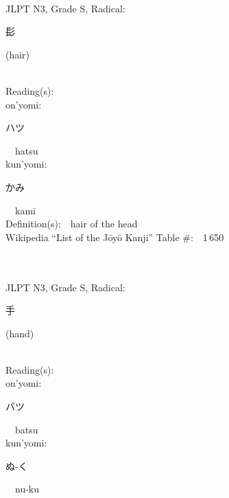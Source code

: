 \begin{multicols}{2}
{\fontsize{34pt}{40pt}  }\ \ \\  %
{JLPT N3, Grade S, Radical:\ \ {\begin{CJK}{UTF8}{min} 髟 \end{CJK}} (hair) } \\
Reading(s):\ \ \\
{\hspace*{1em}}on'yomi:\ \ \\
{\hspace*{2em}}{\begin{CJK}{UTF8}{min} ハツ \end{CJK}}\ \ hatsu\ \ \\
{\hspace*{1em}}kun'yomi:\ \ \\
{\hspace*{2em}}{\begin{CJK}{UTF8}{min} かみ \end{CJK}}\ \ kami\ \ \\
Definition(s):\ \ hair of the head \\
Wikipedia ``List of the J\=oy\=o Kanji'' Table \#:\ \ 1\,650 \\
\ \ \\
{\fontsize{34pt}{40pt}  }\ \ \\  %
{JLPT N3, Grade S, Radical:\ \ {\begin{CJK}{UTF8}{min} 手 \end{CJK}} (hand) } \\
Reading(s):\ \ \\
{\hspace*{1em}}on'yomi:\ \ \\
{\hspace*{2em}}{\begin{CJK}{UTF8}{min} バツ \end{CJK}}\ \ batsu\ \ \\
{\hspace*{1em}}kun'yomi:\ \ \\
{\hspace*{2em}}{\begin{CJK}{UTF8}{min} ぬ-く \end{CJK}}\ \ nu-ku\ \ \\

\end{multicols}
